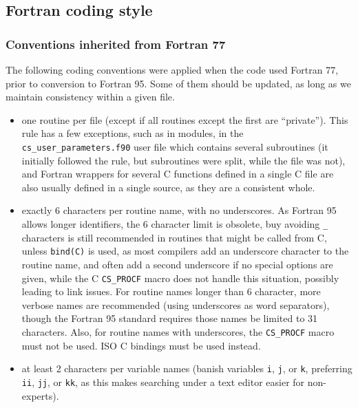\subsection{Fortran coding style}

\subsubsection{Conventions inherited from Fortran 77}

The following coding conventions were applied when the code used
Fortran 77, prior to conversion to Fortran 95. Some of them should be
updated, as long as we maintain consistency within a given
file.

\begin{itemize}

\item one routine per file (except if all routines except the first
      are ``private''). This rule has a few exceptions, such as in modules,
      in the \texttt{cs\_user\_parameters.f90} user file which contains several
      subroutines (it initially followed the rule, but subroutines were split,
      while the file was not), and Fortran wrappers for several C
      functions defined in a single C file are also usually defined
      in a single source, as they are a consistent whole.

\item exactly 6 characters per routine name, with no underscores.
      As Fortran 95 allows longer identifiers, the 6 character limit is
      obsolete, buy avoiding \texttt{\_} characters is still recommended
      in routines that might be called from C, unless \texttt{bind(C)}
      is used, as most compilers add an underscore character to the routine
      name, and often add a second underscore if no special options are given,
      while the C \texttt{CS\_PROCF} macro does not handle this situation,
      possibly leading to link issues.
      For routine names longer than 6 character, more verbose names
      are recommended (using underscores as word separators), though
      the Fortran 95 standard requires those names be limited to 31
      characters.
      Also, for routine names with underscores, the \texttt{CS\_PROCF}
      macro must not be used. ISO C bindings must be used instead.

\item at least 2 characters per variable names
      (banish variables \texttt{i}, \texttt{j}, or \texttt{k},
       preferring \texttt{ii}, \texttt{jj}, or \texttt{kk}, as this makes
       searching under a text editor easier for non-experts).


\end{itemize}
